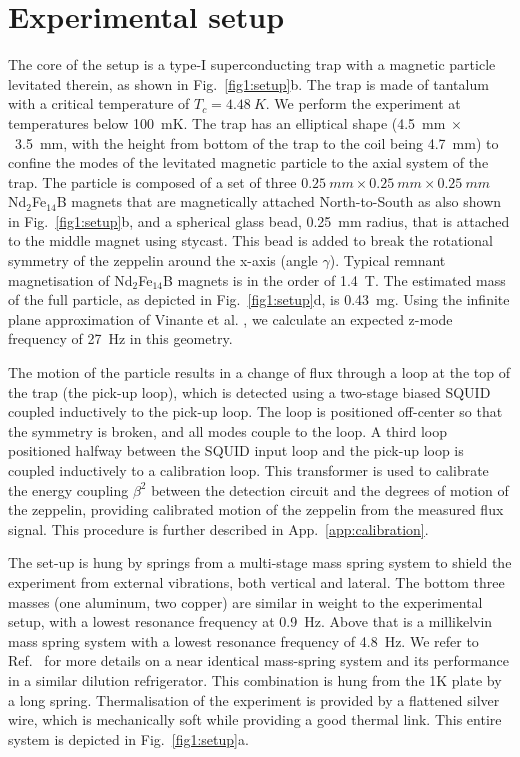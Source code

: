 \section{Experimental setup}\label{sec:setup}
The core of the setup is a type-I superconducting trap with a magnetic particle levitated therein, as shown in Fig.~\ref{fig1:setup}b.
The trap is made of tantalum with a critical temperature of $T_c = \SI{4.48}{K}$. We perform the experiment at temperatures below \SI{100}{mK}.
The trap has an elliptical shape (\SI{4.5}{mm}$~\times$~\SI{3.5}{mm}, with the height from bottom of the trap to the coil being \SI{4.7}{mm}) to confine the modes of the levitated magnetic particle to the axial system of the trap.
The particle is composed of a set of three $\SI{0.25}{mm} \times \SI{0.25}{mm} \times \SI{0.25}{mm}$ Nd$_{2}$Fe$_{14}$B magnets that are magnetically attached North-to-South as also shown in Fig.~\ref{fig1:setup}b, and a spherical glass bead, \SI{0.25}{mm} radius, that is attached to the middle magnet using stycast. This bead is added to break the rotational symmetry of the zeppelin around the x-axis (angle $\gamma$).
Typical remnant magnetisation of Nd$_{2}$Fe$_{14}$B magnets is in the order of \SI{1.4}{T}.
The estimated mass of the full particle, as depicted in Fig.~\ref{fig1:setup}d, is \SI{0.43}{mg}.
Using the infinite plane approximation of Vinante et al. \cite{vinante2020}, we calculate an expected z-mode frequency of \SI{27}{Hz} in this geometry.

The motion of the particle results in a change of flux through a loop at the top of the trap (the pick-up loop), which is detected using a two-stage biased SQUID coupled inductively to the pick-up loop. The loop is positioned off-center so that the symmetry is broken, and all modes couple to the loop.
A third loop positioned halfway between the SQUID input loop and the pick-up loop is coupled inductively to a calibration loop. This transformer is used to calibrate the energy coupling $\beta^2$ between the detection circuit and the degrees of motion of the zeppelin, providing calibrated motion of the zeppelin from the measured flux signal.
This procedure is further described in App.~\ref{app:calibration}.

The set-up is hung by springs from a multi-stage mass spring system to shield the experiment from external vibrations, both vertical and lateral.
The bottom three masses (one aluminum, two copper) are similar in weight to the experimental setup, with a lowest resonance frequency at \SI{0.9}{Hz}.
Above that is a millikelvin mass spring system with a lowest resonance frequency of \SI{4.8}{Hz}.
We refer to Ref.~\cite{wit2019} for more details on a near identical mass-spring system and its performance in a similar dilution refrigerator.
This combination is hung from the 1K plate by a long spring. 
Thermalisation of the experiment is provided by a flattened silver wire, which is mechanically soft while providing a good thermal link.
This entire system is depicted in Fig.~\ref{fig1:setup}a. 

